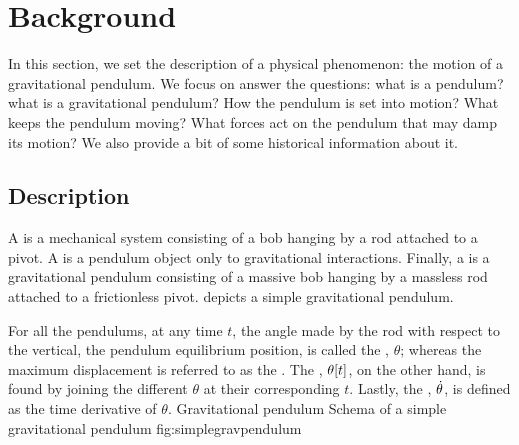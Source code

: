 \newcommand{\angpos}{\theta}     %
\newcommand{\angvel}{\dt\theta}  %
\newcommand{\angacc}{\ddt\theta} %
\newcommand{\torque}{\tau}       %
\newcommand{\fcoeff}{\alpha}     %
\newcommand{\oscper}{\tau}       %
\newcommand{\natfreq}{\omega}    %
\newcommand{\cycfreq}{f}         %
%
\newcommand{\lvel}{v} %
\newcommand{\lacc}{a} %
%
\newcommand{\height}{h}        %
\newcommand{\disp}{x}          %
\newcommand{\odisp}{x}         %
\newcommand{\ovel}{\dt\odisp}  %
\newcommand{\oacc}{\ddt\odisp} %
\newcommand{\oper}{\tau}       %
%
\newcommand{\scovel}{\dt{\scpq{\odisp}}}  %
\newcommand{\scoacc}{\ddt{\scpq{\odisp}}} %

\section{Background}
In this section, we set the description of a physical phenomenon: the motion of a gravitational pendulum. We focus on answer the questions: what is a pendulum? what is a gravitational pendulum? How the pendulum is set into motion? What keeps the pendulum moving? What forces act on the pendulum that may damp its motion? We also provide a bit of some historical information about it.


\subsection{Description}
A  is a mechanical system consisting of a bob hanging by a rod attached to a pivot.  A  is a pendulum object only to gravitational interactions. Finally, a  is a gravitational pendulum consisting of a massive bob hanging by a massless rod attached to a frictionless pivot.  depicts a simple gravitational pendulum. 

For all the pendulums, at any time $t$, the angle made by the rod with respect to the vertical, the pendulum equilibrium position, is called the , $\angpos$; whereas the maximum displacement is referred to as the . The , $\angpos\vat t$, on the other hand, is found by joining the different $\angpos$ at their corresponding $t$. Lastly, the , $\angvel$, is defined as the time derivative of $\angpos$.
%
%
   {Gravitational pendulum}
   {Schema of a simple gravitational pendulum}%
   {fig:simplegravpendulum}%

